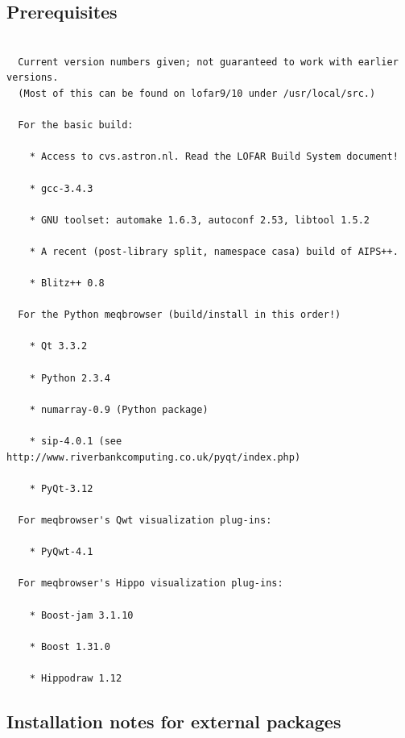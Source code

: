 \documentclass[10pt]{article}
\begin{document}
\subsection{Prerequisites} 
  
\begin{verbatim}

  Current version numbers given; not guaranteed to work with earlier versions.
  (Most of this can be found on lofar9/10 under /usr/local/src.)

  For the basic build:

    * Access to cvs.astron.nl. Read the LOFAR Build System document!

    * gcc-3.4.3

    * GNU toolset: automake 1.6.3, autoconf 2.53, libtool 1.5.2

    * A recent (post-library split, namespace casa) build of AIPS++.

    * Blitz++ 0.8

  For the Python meqbrowser (build/install in this order!)

    * Qt 3.3.2

    * Python 2.3.4

    * numarray-0.9 (Python package)

    * sip-4.0.1 (see http://www.riverbankcomputing.co.uk/pyqt/index.php)

    * PyQt-3.12

  For meqbrowser's Qwt visualization plug-ins:
  
    * PyQwt-4.1

  For meqbrowser's Hippo visualization plug-ins:

    * Boost-jam 3.1.10

    * Boost 1.31.0

    * Hippodraw 1.12
\end{verbatim}
  
\subsection{Installation notes for external packages}
  
\end{document}
